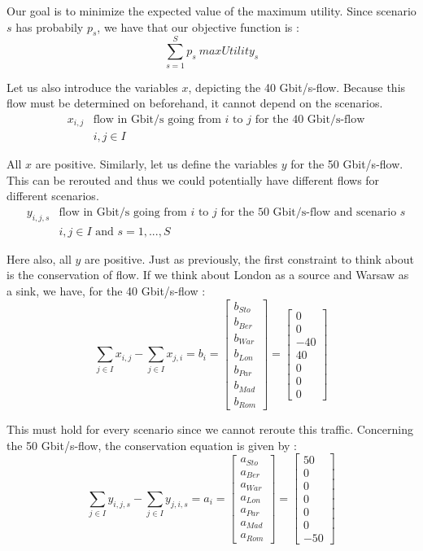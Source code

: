 Our goal is to minimize the expected value of the maximum utility. Since scenario $s$ has probabily $p_s$, we have that our objective function is :
$$\sum_{s=1}^S p_s\: maxUtility_s$$

Let us also introduce the variables $x$, depicting the 40 Gbit/s-flow. Because this flow must be determined on beforehand, it cannot depend on the scenarios.
\begin{align*}
&x_{i,j} &\text{flow in Gbit/s going from $i$ to $j$ for the 40 Gbit/s-flow}\\
& &i,j \in I
\end{align*}

All $x$ are positive. Similarly, let us define the variables $y$ for the 50 Gbit/s-flow. This can be rerouted and thus we could potentially have different flows for different scenarios.
\begin{align*}
&y_{i,j,s} &\text{flow in Gbit/s going from $i$ to $j$ for the 50 Gbit/s-flow and scenario $s$}\\
& &i,j \in I \text{ and } s=1,...,S
\end{align*}

Here also, all $y$ are positive. Just as previously, the first constraint to think about is the conservation of flow. If we think about London as a source and Warsaw as a sink, we have, for the 40 Gbit/s-flow : 
$$\sum_{j\in I} x_{i,j} - \sum_{j\in I}x_{j,i} = b_i = \begin{bmatrix}
  b_{Sto}\\
  b_{Ber}\\
  b_{War}\\
  b_{Lon}\\
  b_{Par}\\
  b_{Mad}\\
  b_{Rom}
 \end{bmatrix} =
 \begin{bmatrix}
  0\\
  0\\
  -40\\
  40\\
  0\\
  0\\
  0
 \end{bmatrix}$$
 
 This must hold for every scenario since we cannot reroute this traffic. Concerning the 50 Gbit/s-flow, the conservation equation is given by : 
 $$\sum_{j\in I} y_{i,j,s} - \sum_{j\in I}y_{j,i,s} = a_i = \begin{bmatrix}
  a_{Sto}\\
  a_{Ber}\\
  a_{War}\\
  a_{Lon}\\
  a_{Par}\\
  a_{Mad}\\
  a_{Rom}
 \end{bmatrix} =
 \begin{bmatrix}
  50\\
  0\\
  0\\
  0\\
  0\\
  0\\
  -50
 \end{bmatrix}$$
 
